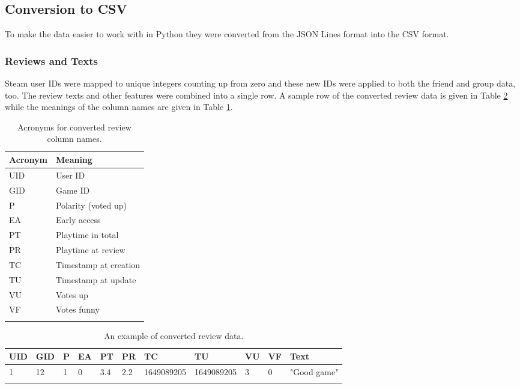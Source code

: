 \subsection{Conversion to CSV}

To make the data easier to work with in Python they were converted from the JSON Lines format into the CSV format.

\subsubsection{Reviews and Texts}

Steam user IDs were mapped to unique integers counting up from zero and these new IDs were applied to both the friend and group data, too. The review texts and other features were combined into a single row. A sample row of the converted review data is given in Table \ref{tab:ExampleData_Review} while the meanings of the column names are given in Table \ref{tab:ExampleData_Review_Abrv}.

\begin{table}[ht]
    \centering
    \begin{tabular}{l l}
        \toprule
        \textbf{Acronym} & \textbf{Meaning} \\\midrule
        UID & User ID\\
        GID & Game ID\\
        P & Polarity (voted up)\\
        EA & Early access\\
        PT & Playtime in total\\
        PR & Playtime at review\\
        TC & Timestamp at creation\\
        TU & Timestamp at update\\
        VU & Votes up\\
        VF & Votes funny\\
        \bottomrule\\
    \end{tabular}
    \caption{Acronyms for converted review column names.}
    \label{tab:ExampleData_Review_Abrv}
\end{table}

\begin{table}[ht]
    \centering
    \begin{tabular}{l l l l l l l l l l l}
        \toprule
        \textbf{UID} & \textbf{GID} & \textbf{P} & \textbf{EA} & \textbf{PT} & \textbf{PR} & \textbf{TC} & \textbf{TU} & \textbf{VU} & \textbf{VF} & \textbf{Text} \\\midrule
        1 & 12 & 1 & 0 & 3.4 & 2.2 & 1649089205 & 1649089205 & 3 & 0 & "Good game"\\
        \bottomrule\\
    \end{tabular}
    \caption{An example of converted review data.}
    \label{tab:ExampleData_Review}
\end{table}

